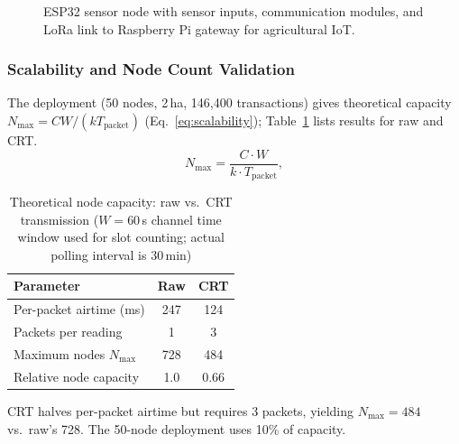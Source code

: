 \documentclass[pdflatex,sn-mathphys-num]{sn-jnl}
\theoremstyle{thmstyleone}
\theoremstyle{thmstyletwo}
\theoremstyle{thmstylethree}
\begin{document}
\begin{figure}
{}%
  \caption{ESP32 sensor node with sensor inputs, communication modules, and LoRa link to Raspberry Pi gateway for agricultural IoT.}
  \label{fig:enhanced-sensor-node}
\end{figure}

\subsubsection{Scalability and Node Count Validation}
\label{subsubsec:scalability_analysis_related}

The deployment (50 nodes, 2\,ha, 146,400 transactions) gives theoretical capacity $N_{\max} = C W / (k T_{\text{packet}})$ (Eq.~\ref{eq:scalability}); Table~\ref{tab:scalability-comparison} lists results for raw and CRT.
\begin{equation}
N_{\max} = \frac{C \cdot W}{k \cdot T_{\text{packet}}},
\label{eq:scalability}
\end{equation}

\begin{table}[htbp]
\centering
\caption{Theoretical node capacity: raw vs.\ CRT transmission ($W = 60$\,s channel time window used for slot counting; actual polling interval is 30\,min)}
\label{tab:scalability-comparison}
\begin{tabular}{lcc}
\toprule
\textbf{Parameter}                & \textbf{Raw} & \textbf{CRT} \\
\midrule
Per-packet airtime (ms)           & 247           & 124           \\
Packets per reading               & 1             & 3             \\
Maximum nodes $N_{\max}$           & 728           & 484           \\
Relative node capacity             & 1.0           & 0.66          \\
\bottomrule
\end{tabular}
\end{table}

CRT halves per-packet airtime but requires 3 packets, yielding $N_{\max}=484$ vs.\ raw’s 728. The 50-node deployment uses 10\% of capacity.
\end{document}
